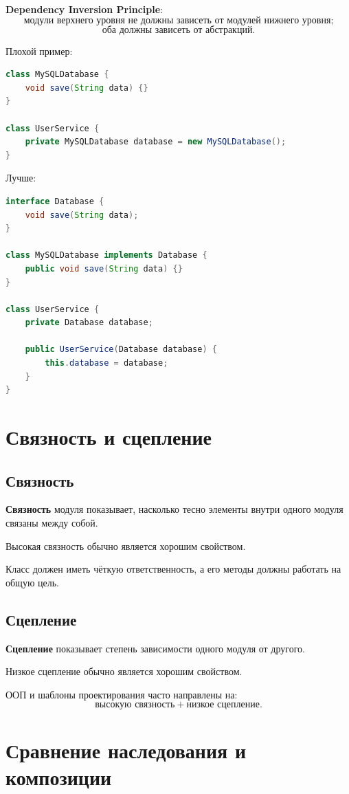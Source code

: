 \documentclass[12pt,a4paper]{article}
\begin{document}
\textbf{Dependency Inversion Principle}:
\[
\text{модули верхнего уровня не должны зависеть от модулей нижнего уровня;}
\]
\[
\text{оба должны зависеть от абстракций.}
\]

Плохой пример:
\begin{lstlisting}[language=Java]
class MySQLDatabase {
    void save(String data) {}
}

class UserService {
    private MySQLDatabase database = new MySQLDatabase();
}
\end{lstlisting}

Лучше:
\begin{lstlisting}[language=Java]
interface Database {
    void save(String data);
}

class MySQLDatabase implements Database {
    public void save(String data) {}
}

class UserService {
    private Database database;

    public UserService(Database database) {
        this.database = database;
    }
}
\end{lstlisting}

\section{Связность и сцепление}

\subsection{Связность}

\textbf{Связность} модуля показывает, насколько тесно элементы внутри одного модуля связаны между собой.

Высокая связность обычно является хорошим свойством.

Класс должен иметь чёткую ответственность, а его методы должны работать на общую цель.

\subsection{Сцепление}

\textbf{Сцепление} показывает степень зависимости одного модуля от другого.

Низкое сцепление обычно является хорошим свойством.

ООП и шаблоны проектирования часто направлены на:
\[
\text{высокую связность} + \text{низкое сцепление}.
\]

\section{Сравнение наследования и композиции}
\end{document}
